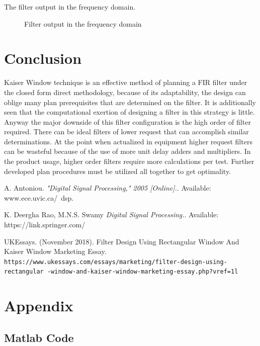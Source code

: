 \documentclass[twoside,12pt,times,onecolumn,a4paper]{report}
\begin{document}
The filter output in the frequency domain.

\begin{figure}[H]
  \centering
    
  \caption{Filter output in the frequency domain}
\end{figure}






\chapter{Conclusion}
\hspace{4em}Kaiser Window technique is an effective method of planning a FIR filter under the closed form direct methodology, because of its adaptability, the design can oblige many plan prerequisites that are determined on the filter. It  is additionally seen that the computational exertion of designing a filter in this strategy is little. Anyway the major downside of this filter configuration is the high order of filter required. There can be ideal filters of lower request that can accomplish similar determinations. At the point when actualized in equipment higher request filters can be wasteful because of the use of more unit delay adders and multipliers. In the product usage, higher order filters require more calculations per test. Further developed plan procedures must be utilized all together to get optimality.

\medskip


\begin{thebibliography}{9}
A. Antoniou. 
\textit{"Digital Signal Processing," 2005 [Online].}. 
Available: www.ece.uvic.ca/~dsp.

K. Deergha Rao, M.N.S. Swamy
\textit{Digital Signal Processing.}. 
Available: https://link.springer.com/

UKEssays. (November 2018). Filter Design Using Rectangular Window And Kaiser Window Marketing Essay. 
\\\texttt{https://www.ukessays.com/essays/marketing/filter-design-using-rectangular
-window-and-kaiser-window-marketing-essay.php?vref=1l}
\end{thebibliography}


\appendix
\chapter{Appendix}
\section{Matlab Code}
%
\end{document}
